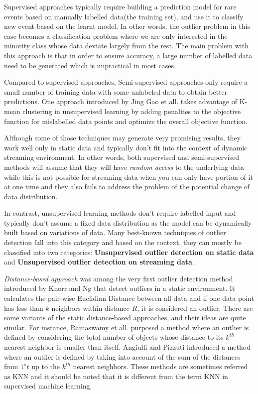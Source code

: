 \documentclass[11pt]{article}       %
\begin{document}
Supervised approaches typically require building a prediction model for rare events based on manually labelled data(the training set), and use it to classify new event based on the learnt model\cite{Joshi:2001:MNH:376284.375673,sup02}. In other words, the outlier problem in this case becomes a classification problem where we are only interested in the minority class whose data deviate largely from the rest. The main problem with this approach is that in order to ensure accuracy, a large number of labelled data need to be generated which is unpractical in most cases.
 
Compared to supervised approaches, Semi-supervised approaches\cite{Basu:2004:PFS:1014052.1014062,semi-sup02} only require a small number of training data with some unlabeled data to obtain better predictions. One approach introduced by Jing Gao et all.\cite{Gao:2006:SOD:1141277.1141421} takes advantage of K-mean clustering in unsupervised learning by adding penalties to the objective function for mislabelled data points and optimize the overall objective function. 

Although some of those techniques may generate very promising results, they work well only in static data and typically don't fit into the context of dynamic streaming environment. In other words, both supervised and semi-supervised methods will assume that they will have \textit{random access} to the underlying data while this is not possible for streaming data when you can only have portion of it at one time and they also fails to address the problem of the potential change of data distribution.

In contrast, unsupervised learning methods don't require labelled input and typically don't assume a fixed data distribution as the model can be dynamically built based on variations of data. Many best-known techniques of outlier detection fall into this category and based on the context, they can mostly be classified into two categories: \textbf{Unsupervised outlier detection on static data} and \textbf{Unsupervised outlier detection on streaming data}. 

\textit{Distance-based approach} was among the very first outlier detection method introduced by Knorr and Ng\cite{EKnorr:1998} that detect outliers in a static environment. It calculates the pair-wise Euclidian Distance between all data and if one data point has less than $k$ neighbors within distance $R$, it is considered an outlier. There are some variants of the static distance-based approaches, and their ideas are quite similar. For instance, Ramaswamy et all.\cite{Ramaswamy:2000:EAM:342009.335437} purposed a method where an outlier is defined by considering the total number of objects whose distance to its $k^{th}$ nearest neighbor is smaller than itself. Angiulli and Pizzuti\cite{1377172} introduced a method where an outlier is defined by taking into account of the sum of the distances from $1^st$ up to the $k^{th}$ nearest neighbors. These methods are sometimes referred as KNN and it should be noted that it is different from the term KNN in supervised machine learning. 
\end{document}
